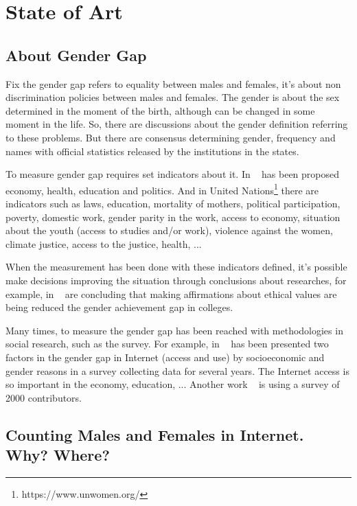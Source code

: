 \documentclass[a4paper]{article}
\begin{document}
\section{State of Art}
\label{sec:stateofart}

\subsection{About Gender Gap}

Fix the gender gap refers to equality between males and females, it's
about non discrimination policies between males and females. The
gender is about the sex determined in the moment of the birth,
although can be changed in some moment in the life. So, there are
discussions about the gender definition referring to these
problems. But there are consensus determining gender, frequency and
names with official statistics released by the institutions in the
states.

To measure gender gap requires set indicators about it. In
~\cite{world2021global} has been proposed economy, health, education
and politics. And in United Nations\footnote{https://www.unwomen.org/}
there are indicators such as laws, education, mortality of mothers,
political participation, poverty, domestic work, gender parity in
the work, access to economy, situation about the youth (access to
studies and/or work), violence against the women, climate justice,
access to the justice, health, ...

When the measurement has been done with these indicators defined, it's
possible make decisions improving the situation through conclusions
about researches, for example, in ~\cite{miyake2010reducing} are
concluding that making affirmations about ethical values are being
reduced the gender achievement gap in colleges.

Many times, to measure the gender gap has been reached with
methodologies in social research, such as the survey. For example, in
~\cite{bimber2000measuring} has been presented two factors in the
gender gap in Internet (access and use) by socioeconomic and gender
reasons in a survey collecting data for several years. The Internet
access is so important in the economy, education, ... Another work
~\cite{10.1007/978-3-319-39225-7_13} is using a survey of 2000
contributors.

\subsection{Counting Males and Females in Internet. Why? Where?}
\end{document}
